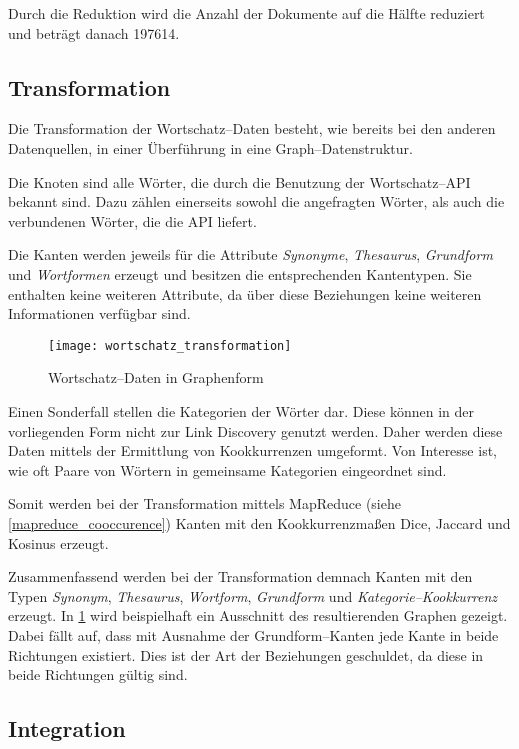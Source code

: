 Durch die Reduktion wird die Anzahl der Dokumente auf die Hälfte reduziert und beträgt danach \num{197614}.

\subsection{Transformation}

Die Transformation der Wortschatz--Daten besteht, wie bereits bei den anderen Datenquellen, in einer Überführung in eine Graph--Datenstruktur. 

Die Knoten sind alle Wörter, die durch die Benutzung der Wortschatz--API bekannt sind. Dazu zählen einerseits sowohl die angefragten Wörter, als auch die verbundenen Wörter, die die API liefert.

Die Kanten werden jeweils für die Attribute \emph{Synonyme}, \emph{Thesaurus}, \emph{Grundform} und \emph{Wortformen} erzeugt und besitzen die entsprechenden Kantentypen. Sie enthalten keine weiteren Attribute, da über diese Beziehungen keine weiteren Informationen verfügbar sind.
\begin{figure}
\centering
\texttt{[image: wortschatz\_transformation]}
\caption{Wortschatz--Daten in Graphenform}
\label{fig:wortschatz_transformation}
\end{figure}

Einen Sonderfall stellen die Kategorien der Wörter dar. Diese können in der vorliegenden Form nicht zur Link Discovery genutzt werden. Daher werden diese Daten mittels der Ermittlung von Kookkurrenzen umgeformt. Von Interesse ist, wie oft Paare von Wörtern 
in gemeinsame Kategorien eingeordnet sind. 

Somit werden bei der Transformation mittels MapReduce (siehe \cref{mapreduce_cooccurence}) Kanten mit den Kookkurrenzmaßen Dice, Jaccard und Kosinus erzeugt.

Zusammenfassend werden bei der Transformation demnach Kanten mit den Typen \emph{Synonym}, \emph{Thesaurus}, \emph{Wortform}, \emph{Grundform} und \emph{Kategorie--Kookkurrenz} erzeugt. In \cref{fig:wortschatz_transformation} wird beispielhaft ein Ausschnitt des resultierenden Graphen gezeigt. Dabei fällt auf, dass mit Ausnahme der Grundform--Kanten jede Kante in beide Richtungen existiert. Dies ist der Art der Beziehungen geschuldet, da diese in beide Richtungen gültig sind.

\subsection{Integration}

